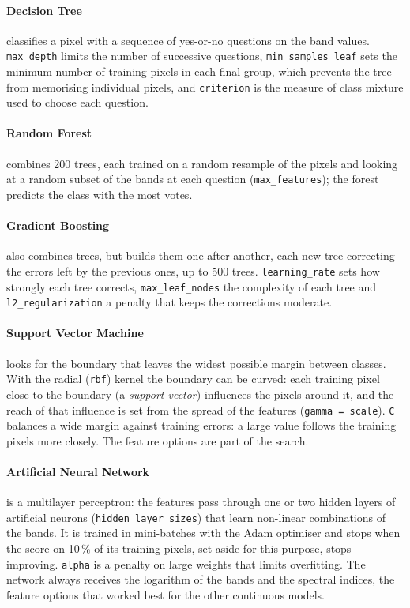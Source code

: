 \documentclass[11pt,a4paper]{article}
\begin{document}
\paragraph{Decision Tree} classifies a pixel with a sequence of yes-or-no
questions on the band values. \texttt{max\_depth} limits the number of
successive questions, \texttt{min\_samples\_leaf} sets the minimum number of
training pixels in each final group, which prevents the tree from memorising
individual pixels, and \texttt{criterion} is the measure of class mixture
used to choose each question.

\paragraph{Random Forest} combines 200 trees, each trained on a random
resample of the pixels and looking at a random subset of the bands at each
question (\texttt{max\_features}); the forest predicts the class with the most
votes.

\paragraph{Gradient Boosting} also combines trees, but builds them one after
another, each new tree correcting the errors left by the previous ones, up to
500 trees. \texttt{learning\_rate} sets how strongly each tree corrects,
\texttt{max\_leaf\_nodes} the complexity of each tree and
\texttt{l2\_regularization} a penalty that keeps the corrections moderate.

\paragraph{Support Vector Machine} looks for the boundary that leaves the
widest possible margin between classes. With the radial (\texttt{rbf}) kernel
the boundary can be curved: each training pixel close to the boundary (a
\emph{support vector}) influences the pixels around it, and the reach of that
influence is set from the spread of the features (\texttt{gamma = scale}).
\texttt{C} balances a wide margin against training errors: a large value
follows the training pixels more closely. The feature options are part of the
search.

\paragraph{Artificial Neural Network} is a multilayer perceptron: the
features pass through one or two hidden layers of artificial neurons
(\texttt{hidden\_layer\_sizes}) that learn non-linear combinations of the
bands. It is trained in mini-batches with the Adam optimiser and stops when
the score on 10\,\% of its training pixels, set aside for this purpose, stops
improving. \texttt{alpha} is a penalty on large weights that limits
overfitting. The network always receives the logarithm of the bands and the
spectral indices, the feature options that worked best for the other
continuous models.
\end{document}
